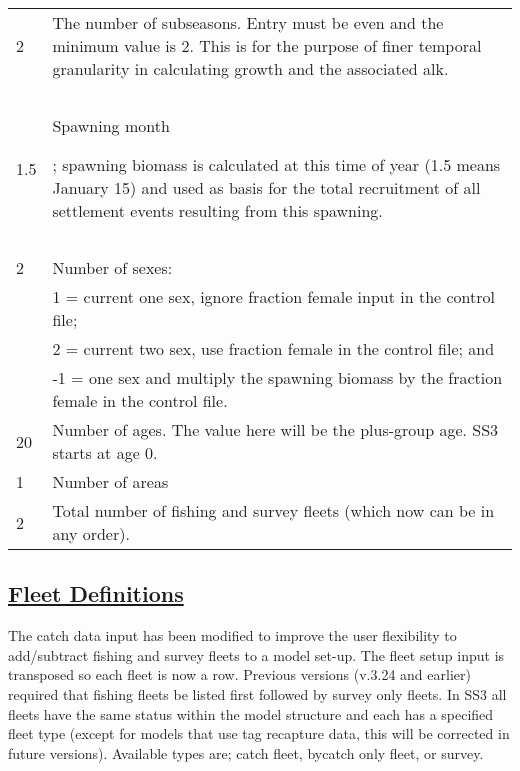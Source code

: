 \begin{center}
\begin{longtable}{p{3cm} p{12cm}}
		\hline
		2 & \multirow{1}{1cm}[-0.1cm]{\parbox{12cm}{The number of subseasons. Entry must be even and the minimum value is 2. This is for the purpose of finer temporal granularity in calculating growth and the associated \gls{alk}.}} \Tstrut\\
		& \\
		& \Bstrut\\
		
		\hline
		1.5 & \multirow{1}{1cm}[-0.1cm]{\parbox{12cm}{\hypertarget{RecrTiminig}{Spawning month}; spawning biomass is calculated at this time of year (1.5 means January 15) and used as basis for the total recruitment of all settlement events resulting from this spawning.}} \Tstrut\\
		& \\
		& \Bstrut\\

		\hline
		2 \Tstrut & Number of sexes: \\
		 & 1 = current one sex, ignore fraction female input in the control file; \\
		 & 2 = current two sex, use fraction female in the control file; and \\
		 & -1 = one sex and multiply the spawning biomass by the fraction female in the control file. \Bstrut\\

		\hline
		20 \Tstrut & Number of ages. The value here will be the plus-group age. SS3 starts at age 0. \\

		\hline
		1 & Number of areas \Tstrut\Bstrut\\

		\hline
		2 \Tstrut & Total number of fishing and survey fleets (which now can be in any order). \\
		\hline
	\end{longtable}
	\vspace*{-1.7\baselineskip}
\end{center}

\hypertarget{FleetDefinitions}{}
\subsection[Fleet Definitions]{\protect\hyperlink{FleetDefinitions}{Fleet Definitions}}
\hypertarget{GenericFleets}{}
The catch data input has been modified to improve the user flexibility to add/subtract fishing and survey fleets to a model set-up. The fleet setup input is transposed so each fleet is now a row. Previous versions (v.3.24 and earlier) required that fishing fleets be listed first followed by survey only fleets. In SS3 all fleets have the same status within the model structure and each has a specified fleet type (except for models that use tag recapture data, this will be corrected in future versions). Available types are; catch fleet, bycatch only fleet, or survey.   

